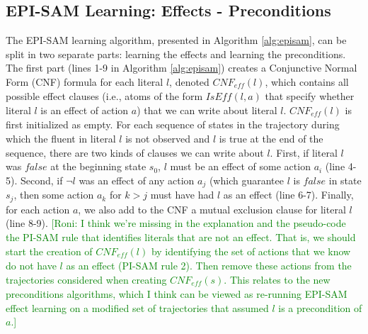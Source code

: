 \documentclass[letterpaper]{article} %
\newcommand{\eff}{\textit{eff}}
\newcommand{\false}{\textit{false}}
\newcommand{\iseff}{\textit{IsEff}}
\newcommand{\roni}[1]{{\textcolor{green}{[Roni: #1]}}}
\begin{document}

\subsection{EPI-SAM Learning: Effects - Preconditions}
The EPI-SAM learning algorithm, presented in Algorithm \ref{alg:episam}, can be split in two separate parts: learning the effects and learning the preconditions. 
The first part (lines 1-9 in Algorithm \ref{alg:episam}) creates a Conjunctive Normal Form (CNF) formula for each literal $l$, denoted $CNF_{\eff}(l)$, which contains all possible effect clauses (i.e., atoms of the form $\iseff(l,a) $ that specify whether literal $l$ is an effect of action $a$) that we can write about literal $l$. 
$CNF_{\eff}(l)$ is first initialized as empty. For each sequence of states in the trajectory during which the fluent in literal $l$ is not observed and $l$ is true at the end of the sequence, there are two kinds of clauses we can write about $l$. First, if literal $l$ was $false$ at the beginning state $s_0$, $l$ must be an effect of some action $a_i$ (line 4-5). Second, if $\neg l$ was an effect of any action $a_j$ (which guarantee $l$ is $\false$ in state $s_j$, then some action $a_k$ for $k > j$ must have had $l$ as an effect (line 6-7). Finally, for each action $a$, we also add to the CNF a mutual exclusion clause for literal $l$ (line 8-9).   
\roni{I think we're missing in the explanation and the pseudo-code the PI-SAM rule that identifies literals that are not an effect. 
That is, we should start the creation of $CNF_\eff(l)$ by identifying the set of actions that we know do not have $l$ as an effect (PI-SAM rule 2). 
Then remove these actions from the trajectories considered when creating $CNF_\eff(s)$. This relates to the new preconditions algorithms, which I think can be viewed as re-running EPI-SAM effect learning on a modified set of trajectories that assumed $l$ is a precondition of $a$.}
\end{document}
